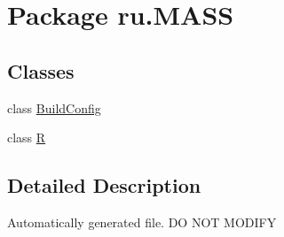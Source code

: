 \hypertarget{namespaceru_1_1_m_a_s_s}{}\section{Package ru.\+M\+A\+SS}
\label{namespaceru_1_1_m_a_s_s}
\subsection*{Classes}
\begin{DoxyCompactItemize}
\item 
class \hyperlink{classru_1_1_m_a_s_s_1_1_build_config}{Build\+Config}
\item 
class \hyperlink{classru_1_1_m_a_s_s_1_1_r}{R}
\end{DoxyCompactItemize}


\subsection{Detailed Description}
Automatically generated file. DO N\+OT M\+O\+D\+I\+FY 